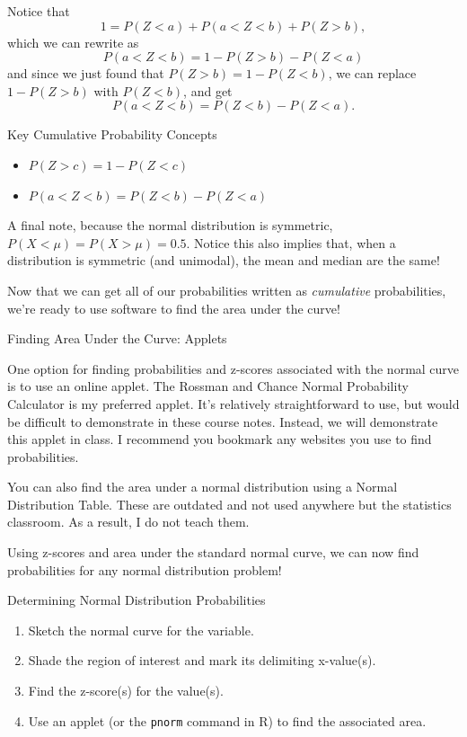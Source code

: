 \documentclass[
]{book}
\providecommand{\tightlist}{%
  \setlength{\itemsep}{0pt}\setlength{\parskip}{0pt}}
\begin{document}
Notice that \[1 = P(Z < a) + P(a < Z < b) + P(Z > b),\] which we can rewrite as \[P(a < Z < b) = 1 - P(Z > b) - P(Z < a)\] and since we just found that \(P(Z > b) = 1 - P(Z < b)\), we can replace \(1 - P(Z > b)\) with \(P(Z < b)\), and get \[P(a < Z < b) = P(Z < b) - P(Z < a).\]

Key Cumulative Probability Concepts

\begin{itemize}
\tightlist
\item
  \(P(Z > c) = 1 - P(Z < c)\)
\item
  \(P(a < Z < b) = P(Z < b) - P(Z < a)\)
\end{itemize}

A final note, because the normal distribution is symmetric, \(P(X < \mu) = P(X > \mu) = 0.5\). Notice this also implies that, when a distribution is symmetric (and unimodal), the mean and median are the same!

Now that we can get all of our probabilities written as \emph{cumulative} probabilities, we're ready to use software to find the area under the curve!

Finding Area Under the Curve: Applets

One option for finding probabilities and z-scores associated with the normal curve is to use an online applet. The Rossman and Chance Normal Probability Calculator is my preferred applet. It's relatively straightforward to use, but would be difficult to demonstrate in these course notes. Instead, we will demonstrate this applet in class. I recommend you bookmark any websites you use to find probabilities.

You can also find the area under a normal distribution using a Normal Distribution Table. These are outdated and not used anywhere but the statistics classroom. As a result, I do not teach them.

Using z-scores and area under the standard normal curve, we can now find probabilities for any normal distribution problem!

Determining Normal Distribution Probabilities

\begin{enumerate}
\def\labelenumi{\arabic{enumi}.}
\tightlist
\item
  Sketch the normal curve for the variable.
\item
  Shade the region of interest and mark its delimiting x-value(s).
\item
  Find the z-score(s) for the value(s).
\item
  Use an applet (or the \texttt{pnorm} command in R) to find the associated area.
\end{enumerate}
\end{document}
